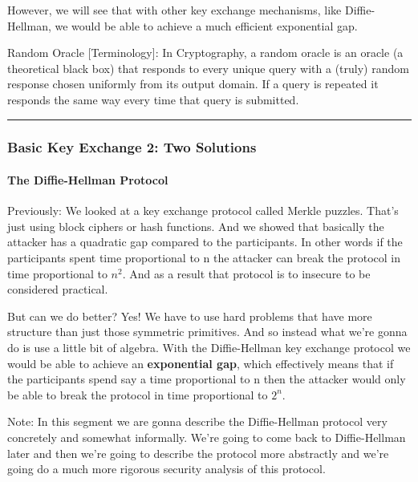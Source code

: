 \documentclass[11pt]{article}
\begin{document}
However, we will see that with other key exchange mechanisms, like
Diffie-Hellman, we would be able to achieve a much efficient exponential
gap.

Random Oracle {[}Terminology{]}: In Cryptography, a random oracle is an
oracle (a theoretical black box) that responds to every unique query
with a (truly) random response chosen uniformly from its output domain.
If a query is repeated it responds the same way every time that query is
submitted.

\begin{center}\rule{0.5\linewidth}{\linethickness}\end{center}

    \hypertarget{basic-key-exchange-2-two-solutions}{%
\subsubsection{Basic Key Exchange 2: Two
Solutions}\label{basic-key-exchange-2-two-solutions}}

\hypertarget{the-diffie-hellman-protocol}{%
\paragraph{The Diffie-Hellman
Protocol}\label{the-diffie-hellman-protocol}}

Previously: We looked at a key exchange protocol called Merkle puzzles.
That's just using block ciphers or hash functions. And we showed that
basically the attacker has a quadratic gap compared to the participants.
In other words if the participants spent time proportional to n the
attacker can break the protocol in time proportional to \(n^{2}\). And
as a result that protocol is to insecure to be considered practical.

But can we do better? Yes! We have to use hard problems that have more
structure than just those symmetric primitives. And so instead what
we're gonna do is use a little bit of algebra. With the Diffie-Hellman
key exchange protocol we would be able to achieve an \textbf{exponential
gap}, which effectively means that if the participants spend say a time
proportional to n then the attacker would only be able to break the
protocol in time proportional to \(2^{n}\).

Note: In this segment we are gonna describe the Diffie-Hellman protocol
very concretely and somewhat informally. We're going to come back to
Diffie-Hellman later and then we're going to describe the protocol more
abstractly and we're going do a much more rigorous security analysis of
this protocol.
\end{document}
